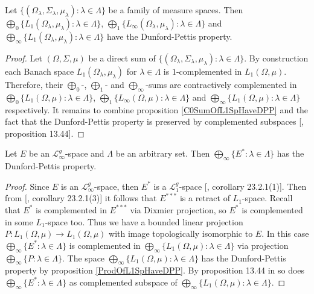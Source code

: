 \begin{proposition}\label{ProdOfL1SpHaveDPP} Let $\{(\Omega_\lambda,\Sigma_\lambda,\mu_\lambda):\lambda\in\Lambda\}$ be a family of measure spaces. Then $\bigoplus_0\{L_1(\Omega_\lambda, \mu_\lambda):\lambda\in\Lambda\}$, $\bigoplus_1\{L_\infty(\Omega_\lambda, \mu_\lambda):\lambda\in\Lambda\}$ and $\bigoplus_\infty\{L_1(\Omega_\lambda,\mu_\lambda):\lambda\in\Lambda\}$ have the Dunford-Pettis property.
\end{proposition}
\begin{proof} Let $(\Omega, \Sigma, \mu)$ be a direct sum of $\{(\Omega_\lambda,\Sigma_\lambda,\mu_\lambda):\lambda\in\Lambda\}$. By construction each Banach space $L_1(\Omega_\lambda,\mu_\lambda)$ for $\lambda\in\Lambda$ is $1$-complemented in $L_1(\Omega, \mu)$. Therefore, their $\bigoplus_0$-, $\bigoplus_1$- and $\bigoplus_\infty$-sums are contractively complemented in $\bigoplus_0\{L_1(\Omega, \mu):\lambda\in\Lambda\}$, $\bigoplus_1\{L_\infty(\Omega, \mu):\lambda\in\Lambda\}$ and $\bigoplus_\infty\{L_1(\Omega,\mu):\lambda\in\Lambda\}$ respectively. It remains to combine proposition \ref{C0SumOfL1SpHaveDPP} and the fact that the Dunford-Pettis property is preserved by complemented subspaces [\cite{FabHabBanSpTh}, proposition 13.44].
\end{proof}

\begin{proposition}\label{ProdOfDualsOfMthscrLInftySpHaveDPP} Let $E$ be an $\mathscr{L}_\infty^g$-space and $\Lambda$ be an arbitrary set. Then $\bigoplus_\infty\{E^*:\lambda\in\Lambda\}$ has the Dunford-Pettis property.
\end{proposition}
\begin{proof} Since $E$ is an $\mathscr{L}_\infty^g$-space, then $E^*$ is a $\mathscr{L}_{1}^g$-space [\cite{DefFloTensNorOpId}, corollary 23.2.1(1)]. Then from [\cite{DefFloTensNorOpId}, corollary 23.2.1(3)] it follows that $E^{***}$ is a retract of $L_1$-space. Recall that $E^*$ is complemented in $E^{***}$ via Dixmier projection, so $E^*$ is complemented in some $L_1$-space too. Thus we have a bounded linear projection $P:L_1(\Omega,\mu)\to L_1(\Omega,\mu)$ with image topologically isomorphic to $E$. In this case $\bigoplus_\infty\{ E^*:\lambda\in\Lambda\}$ is complemented in $\bigoplus_\infty\{ L_1(\Omega,\mu):\lambda\in\Lambda\}$ via projection $\bigoplus_\infty\{P:\lambda\in\Lambda\}$. The space $\bigoplus_\infty\{ L_1(\Omega,\mu):\lambda\in\Lambda\}$ has the Dunford-Pettis property by proposition \ref{ProdOfL1SpHaveDPP}. By proposition 13.44 in \cite{FabHabBanSpTh} so does $\bigoplus_\infty\{ E^*:\lambda\in\Lambda\}$ as complemented subspace of $\bigoplus_\infty\{ L_1(\Omega,\mu):\lambda\in\Lambda\}$.
\end{proof}

